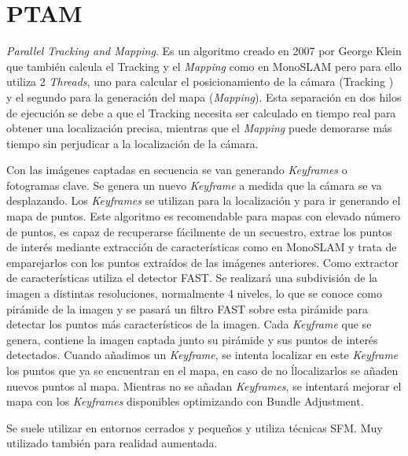 \section{PTAM}
\textit{Parallel Tracking and \textit{Mapping}}. Es un algoritmo creado en 2007 por George Klein \cite{Klein2007parallel} que también calcula el Tracking y el \textit{Mapping} como en MonoSLAM pero para ello utiliza 2 \textit{Threads}, uno para calcular el posicionamiento de la cámara (Tracking ) y el segundo para la generación del mapa (\textit{Mapping}). Esta separación en dos hilos de ejecución se debe a que el Tracking necesita ser calculado en tiempo real para obtener una localización precisa, mientras que el \textit{Mapping} puede demorarse más tiempo sin perjudicar a la localización de la cámara. 

Con las imágenes captadas en secuencia se van generando \textit{Keyframes} o fotogramas clave. Se genera un nuevo \textit{Keyframe} a medida que la cámara se va desplazando. Los \textit{Keyframes} se utilizan para la localización y para ir generando el mapa de puntos.
Este algoritmo es recomendable para mapas con elevado número de puntos, es capaz de recuperarse fácilmente de un secuestro, extrae los puntos de interés mediante extracción de características como en MonoSLAM y trata de emparejarlos con los puntos extraídos de las imágenes anteriores.  Como extractor de características utiliza el detector FAST. Se realizará una subdivisión de la imagen a distintas resoluciones, normalmente 4 niveles, lo que se conoce como pirámide de la imagen y se pasará un filtro FAST sobre esta pirámide para detectar los puntos más característicos de la imagen.
Cada \textit{Keyframe} que se genera, contiene  la imagen captada junto su pirámide y sus puntos de interés detectados. Cuando añadimos un \textit{Keyframe}, se intenta localizar en este \textit{Keyframe} los puntos que ya se encuentran en el mapa, en caso de no ĺlocalizarlos se añaden nuevos puntos al mapa. Mientras no se añadan \textit{Keyframes}, se intentará mejorar el mapa con los \textit{Keyframes} disponibles optimizando con Bundle Adjustment.

Se suele utilizar en entornos cerrados y pequeños y utiliza técnicas SFM. Muy utilizado también para realidad aumentada.

